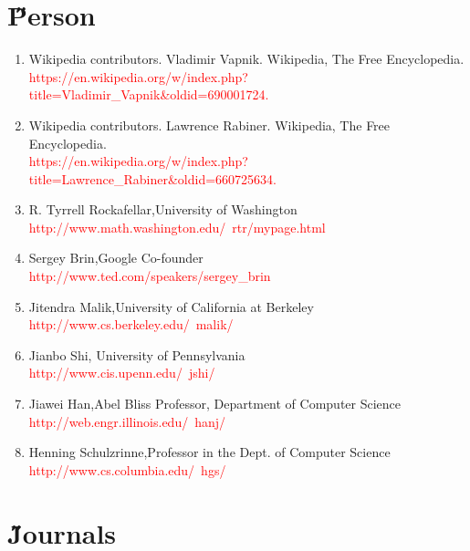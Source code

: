 \documentclass[a4paper,12pt,oneside]{book}
\newcommand{\red}[1]{  \textcolor{red}  {#1}}   %
\begin{document}
\section{\H Person}
\begin{enumerate}
	\item Wikipedia contributors. Vladimir Vapnik. Wikipedia, The Free Encyclopedia.
\\\quad \red{https://en.wikipedia.org/w/index.php?title=Vladimir\_Vapnik\&oldid=690001724.} \\
	\item Wikipedia contributors. Lawrence Rabiner. Wikipedia, The Free Encyclopedia.
\\\quad \red{https://en.wikipedia.org/w/index.php?title=Lawrence\_Rabiner\&oldid=660725634.}\\
    \item R. Tyrrell Rockafellar,University of Washington
\\\quad \red{http://www.math.washington.edu/~rtr/mypage.html}\\
    \item Sergey Brin,Google Co-founder
\\\quad \red{http://www.ted.com/speakers/sergey\_brin}\\
    \item Jitendra Malik,University of California at Berkeley
\\\quad \red{http://www.cs.berkeley.edu/~malik/}\\
    \item Jianbo Shi, University of Pennsylvania
\\\quad \red{http://www.cis.upenn.edu/~jshi/}\\
    \item Jiawei Han,Abel Bliss Professor, Department of Computer Science 
\\\quad \red{http://web.engr.illinois.edu/~hanj/}\\
    \item Henning Schulzrinne,Professor in the Dept. of Computer Science
\\\quad \red{http://www.cs.columbia.edu/~hgs/}


\end{enumerate}



\section{\H Journals}
\end{document}
